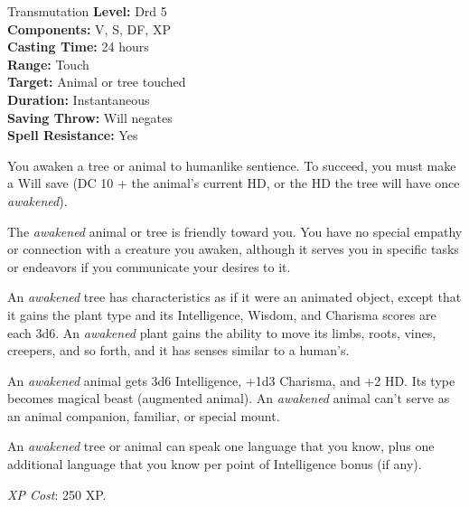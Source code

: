 {Transmutation}
{
	\textbf{Level:}
	Drd 5\\
	\textbf{Components:}
	V, S, DF, XP\\
	\textbf{Casting Time:}
	24 hours\\
	\textbf{Range:}
	Touch\\
	\textbf{Target:}
	Animal or tree touched\\
	\textbf{Duration:}
	Instantaneous\\
	\textbf{Saving Throw:}
	Will negates\\
	\textbf{Spell Resistance:}
	Yes\\
}
{
	You awaken a tree or animal to humanlike sentience. To succeed, you must make a Will save (DC 10 + the animal's current HD, or the HD the tree will have once \emph{awakened}).

	The \emph{awakened} animal or tree is friendly toward you. You have no special empathy or connection with a creature you awaken, although it serves you in specific tasks or endeavors if you communicate your desires to it.

	An \emph{awakened} tree has characteristics as if it were an animated object, except that it gains the plant type and its Intelligence, Wisdom, and Charisma scores are each 3d6. An \emph{awakened} plant gains the ability to move its limbs, roots, vines, creepers, and so forth, and it has senses similar to a human's.

	An \emph{awakened} animal gets 3d6 Intelligence, +1d3 Charisma, and +2 HD. Its type becomes magical beast (augmented animal). An \emph{awakened} animal can't serve as an animal companion, familiar, or special mount.

	An \emph{awakened} tree or animal can speak one language that you know, plus one additional language that you know per point of Intelligence bonus (if any).

	\textit{XP Cost}:
	250 XP.

}
